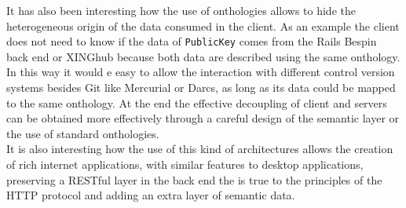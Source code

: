 It has also been interesting how the use of onthologies allows to hide the heterogeneous origin of the data consumed in
the client. As an example the client does not need to know if the data of \texttt{PublicKey} comes from the Rails Bespin
back end or XINGhub because both data are described using the same onthology. In this way it would e easy to allow the
interaction with different control version systems besides Git like Mercurial or Darcs, as long as its data could be
mapped to the same onthology. At the end the effective decoupling of client and servers can be obtained more effectively
through a careful design of the semantic layer or the use of standard onthologies.\\
It is also interesting how the use of this kind of architectures allows the creation of rich internet applications, with
similar features to desktop applications, preserving a RESTful layer in the back end the is true to the principles of the
HTTP protocol and adding an extra layer of semantic data.